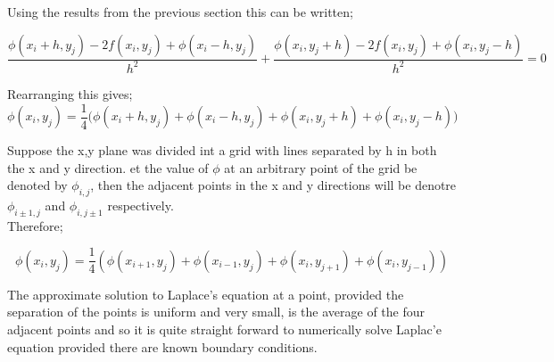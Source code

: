 \documentclass[a4paper,11pt]{article}
\begin{document}
Using the results from the previous section this can be written;

\[\frac{\phi(x_i+h,y_j)-2f(x_i,y_j)+\phi(x_i-h,y_j)}{h^2} +\frac{\phi(x_i,y_j+h)-2f(x_i,y_j)+\phi(x_i,y_j-h)}{h^2}=0\]

\vspace{2mm}Rearranging this gives;
\[\phi(x_i,y_j)=\frac{1}{4}\Bigg(\phi(x_i+h,y_j)+\phi(x_i-h,y_j)+\phi(x_i,y_j+h)+\phi(x_i,y_j-h)\Bigg)\]

Suppose the x,y plane was divided int a grid with lines separated by h in both the x and y direction. et the value of \(\phi\) at an arbitrary point of the grid be denoted by \(\phi_{i,j}\), then the adjacent points in the x and y directions will be denotre \(\phi_{i\pm1,j}\) and \(\phi_{i,j\pm1}\) respectively.\\Therefore;

\[\phi(x_i,y_j)=\frac{1}{4}(\phi(x_{i+1},y_j)+\phi(x_{i-1},y_j)+\phi(x_i,y_{j+1})+\phi(x_i,y_{j-1}))\]

The approximate solution to Laplace's equation at a point, provided the separation of the points is uniform and very small, is the average of the four adjacent points and so it is quite straight forward to numerically solve Laplac'e equation provided there are known boundary conditions.
\end{document}
